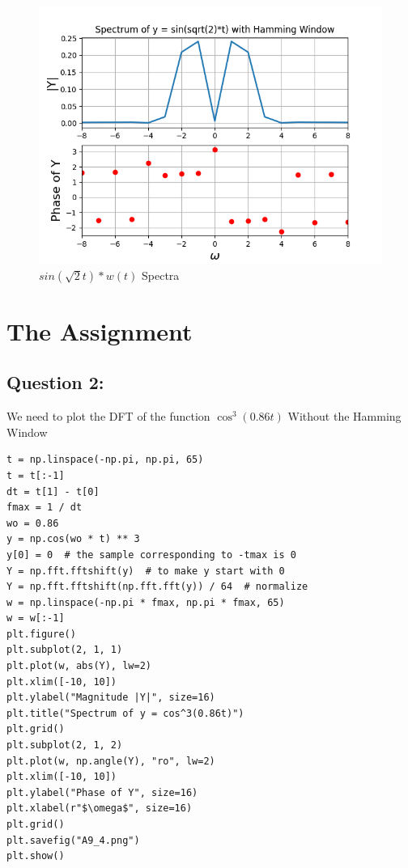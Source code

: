 \documentclass[11pt, a4paper]{article}
\begin{document}
\begin{figure}[!tbh]
   	\centering
  \includegraphics[scale=0.5]{A9_3.png} 
    \caption{$sin(\sqrt{2}t)*w(t)$ Spectra} 	
   \end{figure}  
   
\section{The Assignment}
\subsection{Question 2:} 
We need to plot the DFT of the function $\cos^3(0.86t)$
Without the Hamming Window
\begin{verbatim}
t = np.linspace(-np.pi, np.pi, 65)
t = t[:-1]
dt = t[1] - t[0]
fmax = 1 / dt
wo = 0.86
y = np.cos(wo * t) ** 3
y[0] = 0  # the sample corresponding to -tmax is 0
Y = np.fft.fftshift(y)  # to make y start with 0
Y = np.fft.fftshift(np.fft.fft(y)) / 64  # normalize
w = np.linspace(-np.pi * fmax, np.pi * fmax, 65)
w = w[:-1]
plt.figure()
plt.subplot(2, 1, 1)
plt.plot(w, abs(Y), lw=2)
plt.xlim([-10, 10])
plt.ylabel("Magnitude |Y|", size=16)
plt.title("Spectrum of y = cos^3(0.86t)")
plt.grid()
plt.subplot(2, 1, 2)
plt.plot(w, np.angle(Y), "ro", lw=2)
plt.xlim([-10, 10])
plt.ylabel("Phase of Y", size=16)
plt.xlabel(r"$\omega$", size=16)
plt.grid()
plt.savefig("A9_4.png")
plt.show()

\end{verbatim}
\end{document}
